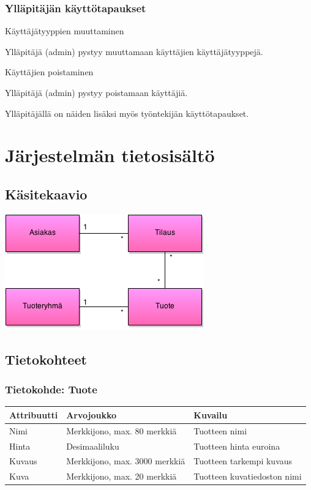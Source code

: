 \documentclass[a4paper,12pt, titlepage]{article}
\begin{document}
\subsubsection*{Ylläpitäjän käyttötapaukset}
Käyttäjätyyppien muuttaminen
\begin{adjustwidth}{2.5em}{0pt}
Ylläpitäjä (admin) pystyy muuttamaan käyttäjien käyttäjätyyppejä.
\end{adjustwidth}
\hfill

\noindent
Käyttäjien poistaminen
\begin{adjustwidth}{2.5em}{0pt}
Ylläpitäjä (admin) pystyy poistamaan käyttäjiä.
\end{adjustwidth}
\hfill

\noindent
Ylläpitäjällä on näiden lisäksi myös työntekijän käyttötapaukset.

\section{Järjestelmän tietosisältö}
\subsection{Käsitekaavio}
\hfill

\begin{center}
\noindent
\includegraphics[keepaspectratio, scale=0.8]{kaaviot/kasitekaavio.png}
\end{center}
\subsection{Tietokohteet}
\subsubsection*{Tietokohde: Tuote}
\begin{table}[H]
\begin{tabularx}{\textwidth}{|p{2.5cm}|p{3.5cm}|X|}
\hline
\bf{Attribuutti} & \textbf{Arvojoukko}	& \textbf{Kuvailu}  \\ \hline
Nimi           & Merkkijono, max. 80 merkkiä   & Tuotteen nimi            \\ \hline
Hinta		   & Desimaaliluku                 & Tuotteen hinta euroina   \\ \hline
Kuvaus         & Merkkijono, max. 3000 merkkiä & Tuotteen tarkempi kuvaus \\ \hline
Kuva           & Merkkijono, max. 20 merkkiä   & Tuotteen kuvatiedoston nimi \\ \hline
\end{tabularx}
\end{table}
\end{document}
